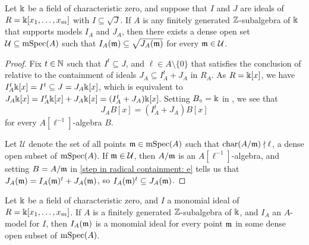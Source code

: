 \documentclass{amsart}
\begin{document}
\begin{corollary}
\label{containment in radical mod p: C}
Let $\Bbbk$ be a field of characteristic zero, and suppose that $I$ and $J$ are ideals of $R = \Bbbk[x_1, \ldots, x_m]$ with $I \subseteq \sqrt{J}$.  If $A$ is any finitely generated $\mathbb{Z}$-subalgebra of $\Bbbk$ that supports models $I_A$ and $J_A$, then there exists a dense open set $\mathcal{U} \subseteq \operatorname{mSpec}(A)$ such that $I_A(\mathfrak{m}) \subseteq \sqrt{J_A(\mathfrak{m})}$ for every $\mathfrak{m} \in \mathcal{U}$.
\end{corollary}

\begin{proof}
   Fix $t \in \mathbb{N}$ such that $I^t \subseteq J$, and $\ell \in A \setminus \{0\}$ that satisfies the conclusion of  relative to the containment of ideals $J_A \subseteq I_A^t + J_A$ in $R_A$.
   As $R = \Bbbk[x]$, we have $I_A^t \Bbbk[x]  = I^t \subseteq J = J_A \Bbbk[x]$, which is equivalent to $J_A \Bbbk[x] = I_A^t \Bbbk[x] + J_A \Bbbk[x] = (I_A^t +J_A)\Bbbk[x]$.
   Setting $B_{\circ} = \Bbbk$ in , we see that
\begin{equation}
\label{step in radical containment: e}
 J_A B[x] = (I_A^t +J_A)B[x]
\end{equation}
for every $A[\ell^{-1}]$-algebra $B$.

Let $\mathcal{U}$ denote the set of all points $\mathfrak{m} \in \operatorname{mSpec}(A)$ such that $\operatorname{char}(A/\mathfrak{m}) \nmid \ell$, a dense open subset of $\operatorname{mSpec}(A)$.
If $\mathfrak{m} \in \mathcal{U}$, then $A/\mathfrak{m}$ is an $A[\ell^{-1}]$-algebra, and setting $B=A/\mathfrak{m}$ in \eqref{step in radical containment: e} tells us that $J_A (\mathfrak{m}) = I_A(\mathfrak{m})^t + J_A(\mathfrak{m})$, so $I_A(\mathfrak{m})^t \subseteq J_A(\mathfrak{m})$.
\end{proof}

\begin{corollary}
   \label{expansion of monomial mod most p is monomial: C}
   Let $\Bbbk$ be a field of characteristic zero, and $I$ a monomial ideal of $R=\Bbbk[x_1, \ldots, x_m]$.
   If $A$ is a finitely generated $\mathbb{Z}$-subalgebra of $\Bbbk$, and $I_A$ an $A$-model for $I$, then $I_A(\mathfrak{m})$ is a monomial ideal for every point $\mathfrak{m}$ in some dense open subset of $\operatorname{mSpec}(A)$.
\end{corollary}
\end{document}
